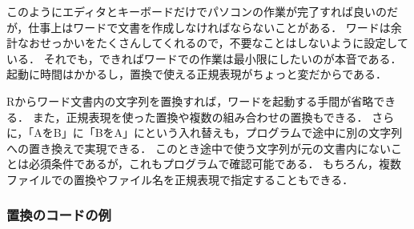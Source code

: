 \documentclass[
]{article}
\begin{document}
このようにエディタとキーボードだけでパソコンの作業が完了すれば良いのだが，仕事上はワードで文書を作成しなければならないことがある．
ワードは余計なおせっかいをたくさんしてくれるので，不要なことはしないように設定している．
それでも，できればワードでの作業は最小限にしたいのが本音である．
起動に時間はかかるし，置換で使える正規表現がちょっと変だからである．

Rからワード文書内の文字列を置換すれば，ワードを起動する手間が省略できる．
また，正規表現を使った置換や複数の組み合わせの置換もできる．
さらに，「AをB」に「BをA」にという入れ替えも，プログラムで途中に別の文字列への置き換えで実現できる．
このとき途中で使う文字列が元の文書内にないことは必須条件であるが，これもプログラムで確認可能である．
もちろん，複数ファイルでの置換やファイル名を正規表現で指定することもできる．

\hypertarget{ux7f6eux63dbux306eux30b3ux30fcux30c9ux306eux4f8b}{%
\subsubsection{置換のコードの例}\label{ux7f6eux63dbux306eux30b3ux30fcux30c9ux306eux4f8b}}
\end{document}

